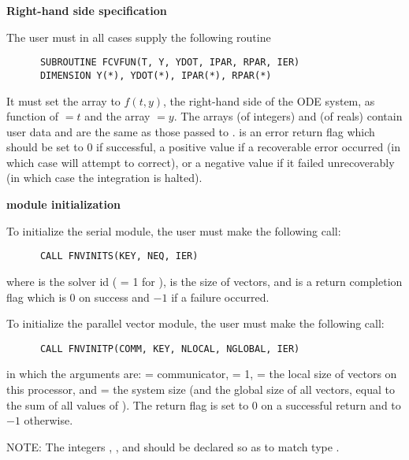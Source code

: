 \begin{Steps}
  
\item {\bf Right-hand side specification}
  
  The user must in all cases supply the following {\F} routine
\begin{verbatim}
      SUBROUTINE FCVFUN(T, Y, YDOT, IPAR, RPAR, IER)
      DIMENSION Y(*), YDOT(*), IPAR(*), RPAR(*)
\end{verbatim}
  It must set the  array to $f(t,y)$, the right-hand side of the ODE
  system, as function of $=t$ and the array $=y$.  
  The arrays  (of integers) and  (of reals) contain user data
  and are the same as those passed to .
   is an error return flag which should be set to $0$ if successful, a positive
  value if a recoverable error occurred (in which case {\cvode} will attempt to correct), 
  or a negative value if it failed unrecoverably (in which case the integration is 
  halted).

\item  {\bf {\nvector} module initialization}

  {\s} To initialize the serial {\nvector} module, the user must make the
  following call:
\begin{verbatim}
      CALL FNVINITS(KEY, NEQ, IER)
\end{verbatim}
  where 
   is the solver id ( = 1 for {\cvode}),
   is the size of vectors, and
   is a  return completion flag which is $0$ on success and $-1$ 
  if a failure occurred.
  
  {\p} To initialize the parallel vector module, the user must make the
  following call:
\begin{verbatim}
      CALL FNVINITP(COMM, KEY, NLOCAL, NGLOBAL, IER)
\end{verbatim}
  in which the arguments are:  = {\mpi} communicator,
   = 1,  = the local size of
  vectors on this processor, and  = the system size (and the global
  size of all vectors, equal to the sum of all values of ).
  The return flag  is set to $0$ on a successful return and to $-1$
  otherwise.

  NOTE: The integers , , and  should be
  declared so as to match {\C} type .


\end{Steps}
